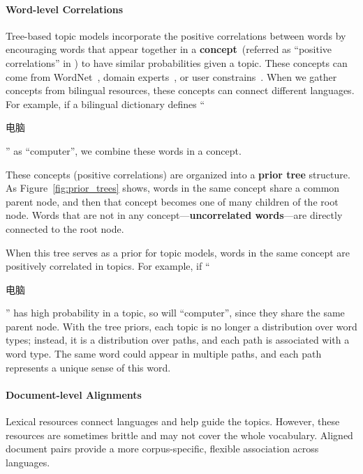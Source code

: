 \paragraph{\bf Word-level Correlations}

Tree-based topic models incorporate the positive correlations between words by encouraging words that appear together in a {\bf concept}~(referred as ``positive correlations'' in \citet{andrzejewski-09,Hu:Boyd-Graber:Satinoff-ur}) to have similar probabilities given a topic. These concepts can come from WordNet~\citep{boyd-graber-10}, domain experts~\citep{andrzejewski-09}, or user constrains~\citep{Hu:Boyd-Graber:Satinoff-ur}. When we gather concepts from bilingual resources, these concepts can connect different languages.  For example, if a bilingual dictionary defines ``\begin{CJK*}{UTF8}{gbsn}电脑\end{CJK*}'' as ``computer'', we combine these words in a concept.

These concepts (positive correlations) are organized into a {\bf prior tree} structure. As Figure~\ref{fig:prior_trees} shows, words in the same concept share a common parent node, and then that concept becomes one of many children of the root node.  Words that are not in any concept---{\bf uncorrelated words}---are directly connected to the root node.

When this tree serves as a prior for topic models, words in the same concept are positively correlated in topics. 
For example, if ``\begin{CJK*}{UTF8}{gbsn}电脑\end{CJK*}'' has high probability in a topic, so will ``computer'', since they share the same parent node. With the tree priors, each topic is no longer a distribution over word types; instead, it is a distribution over paths, and each path is
associated with a word type.  The same word could appear in multiple paths, and each path represents a unique sense of this word.

\paragraph{\bf Document-level Alignments}

Lexical resources connect languages and help guide the topics. However, these resources are sometimes brittle and may not cover the whole vocabulary.  Aligned document pairs provide a more corpus-specific, flexible association across languages.

